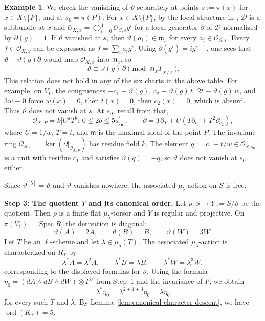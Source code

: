 \documentclass[10pt,abstract=true]{scrartcl}
\numberwithin{equation}{section}
\theoremstyle{definition}
\newtheorem{example}[theorem]{Example}
\theoremstyle{remark}
\DeclareMathOperator\ord{ord}
\begin{document}
\begin{example}
  \smallskip
  We check the vanishing of \(\vartheta\) separately at points
  \(s:=\pi(x)\) for \(x\in X\setminus\{P\}\), and at \(s_0 = \pi(P)\).
  For \(x\in X\setminus\{P\}\), by the local structure in \cite{WZ26}, \(\mathcal D\) is a subbundle at \(x\) and \(\mathcal O_{X,x}=\bigoplus_{i=0}^{4}\mathcal O_{S,s}g^i\) for a local generator \(\partial\) of \(\mathcal D\) normalized by \(\partial(g)=1\).
  If \(\vartheta\) vanished at \(s\), then \(\vartheta(a_i)\in\mathfrak m_s\) for every \(a_i\in\mathcal O_{S,s}\).
  Every $f\in\mathcal O_{X,x}$ can be expressed as \(f=\sum_i a_i g^i\). 
  Using \(\partial(g^i)=i g^{i-1}\), one sees that \(\vartheta-\vartheta(g)\partial\) would map \(\mathcal O_{X,x}\) into \(\mathfrak m_x\), so
  \[
    \vartheta\equiv\vartheta(g)\,\partial\pmod{\mathfrak m_x T_{\widetilde X/\ell}}
  .
  \]
  This relation does not hold in any of the six charts in the above table.
  For example, on \(V_1\), the congruences \(-c_1\equiv\vartheta(g)\), \(c_2\equiv\vartheta(g)\,t\), \(2t\equiv\vartheta(g)\,w\), and \(3w\equiv0\) force \(w(x)=0\), then \(t(x)=0\), then \(c_2(x)=0\), which is absurd.
  Thus $\vartheta$ does not vanish at $s$.
  At \(s_0\), recall from \cite{WZ26} that, 
  \[
    \mathcal O_{X,P}=k\bigl[U^aT^b:\ 0\le2b\le5a\bigr]_{\mathfrak m},\qquad
    \partial=T\partial_T+U(T\partial_{c_1}+T^2\partial_{c_2}),
  \]
  where \(U=1/w\), \(T=t\), and \(\mathfrak m\) is the maximal ideal of the point \(P\).
  The invariant ring \(\mathcal O_{S,s_0}=\ker(\partial|_{\mathcal O_{X,P}})\) has residue field \(k\).
  The element \(q:=c_1-t/w\in\mathcal O_{S,s_0}\) is a unit with residue \(c_1\) and satisfies \(\vartheta(q)=-q\), so \(\vartheta\) does not vanish at \(s_0\) either.

  Since \(\vartheta^{[5]}=\vartheta\) and \(\vartheta\) vanishes nowhere, the associated \(\mu_5\)-action on \(S\) is free.

  \par\smallskip
  \noindent\textbf{Step 3: The quotient $Y$ and its canonical order.}
  Let \(\rho\colon S\to Y:=S/\vartheta\) be the quotient.
  Then \(\rho\) is a finite flat \(\mu_5\)-torsor and \(Y\) is regular and projective.
  On \(\pi(V_1)=\operatorname{Spec}R\), the derivation is diagonal:
  \[
    \vartheta(A)=2A,\qquad \vartheta(B)=B,\qquad \vartheta(W)=3W.
  \]
  Let \(T\) be an \(\ell\)-scheme and let \(\lambda\in\mu_5(T)\).
  The associated \(\mu_5\)-action is characterized on \(R_T\) by
  \[
    \lambda^*A=\lambda^2A,\qquad \lambda^*B=\lambda B,\qquad
    \lambda^*W=\lambda^3W,
  \]
  corresponding to the displayed formulas for \(\vartheta\).
  Using the formula
  \(\eta_0=(dA\wedge dB\wedge dW)\otimes F^\vee\) from Step~1 and the invariance of \(F\), we obtain
  \[
    \lambda^*\eta_0=\lambda^{2+1+3}\eta_0=\lambda\eta_0
  \]
  for every such \(T\) and \(\lambda\).
  By Lemma~\ref{lem:canonical-character-descent}, we have \(\ord(K_Y)=5\).


\end{example}
\end{document}
